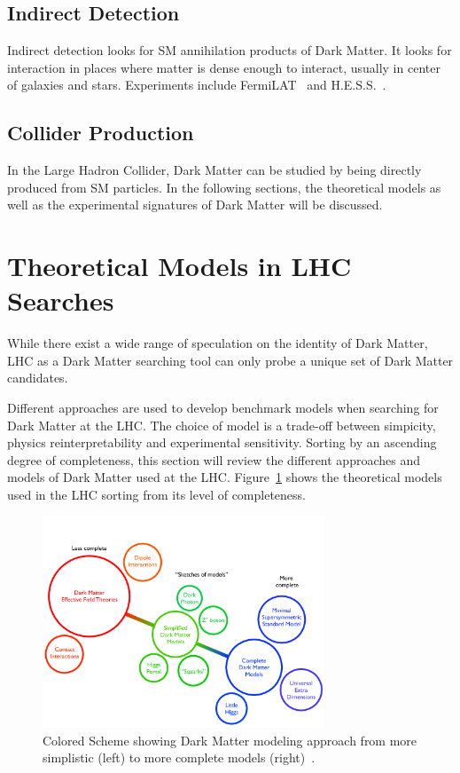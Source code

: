\subsection{Indirect Detection}
Indirect detection looks for SM annihilation products of Dark Matter. It looks for interaction in places where matter is dense enough to interact, usually in center of galaxies and stars. Experiments include FermiLAT~\cite{albert2017searching} and H.E.S.S.~\cite{aharonian2006hess}.

\subsection{Collider Production} 
In the Large Hadron Collider, Dark Matter can be studied by being directly produced from SM particles. In the following sections, the theoretical models as well as the experimental signatures of Dark Matter will be discussed. 

\section{Theoretical Models in LHC Searches}
\label{section:models}
While there exist a wide range of speculation on the identity of Dark Matter, LHC as a Dark Matter searching tool can only probe a unique set of Dark Matter candidates.

Different approaches are used to develop benchmark models when searching for Dark Matter at the LHC. The choice of model is a trade-off between simpicity, physics reinterpretability and experimental sensitivity. Sorting by an ascending degree of completeness, this section will review the different approaches and models of Dark Matter used at the LHC. Figure~\ref{fig:Model_figure} shows the theoretical models used in the LHC sorting from its level of completeness.

\begin{figure}[!htb]
    \begin{center}
        \includegraphics[width=0.75\textwidth]{figures/chapter_DM/Model}
        \caption{
			Colored Scheme showing Dark Matter modeling approach from more simplistic (left) to more complete models (right)~\cite{Abdallah:2024101}.
        }
        \label{fig:Model_figure}
    \end{center}
\end{figure}

